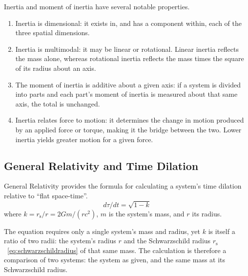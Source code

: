 \documentclass[twoside,twocolumn,9pt,fleqn]{article}
\begin{document}
Inertia and moment of inertia have several notable properties.
\begin{enumerate}
\item Inertia is dimensional: it exists in, and has a component within, each of the three spatial dimensions.
\item Inertia is multimodal: it may be linear or rotational. Linear inertia reflects the mass alone, whereas rotational inertia reflects the mass times the square of its radius about an axis.
\item The moment of inertia is additive about a given axis: if a system is divided into parts and each part's moment of inertia is measured about that same axis, the total is unchanged.
\item Inertia relates force to motion: it determines the change in motion produced by an applied force or torque, making it the bridge between the two. Lower inertia yields greater motion for a given force.
\end{enumerate}
\subsection{General Relativity and Time Dilation}
General Relativity provides the formula for calculating a system's time dilation relative to ``flat space-time''.
\begin{equation}
d\tau/dt = \sqrt{1-k}
\end{equation}
where $k = r_{\mathrm{s}}/r = 2Gm/(rc^2)$, $m$ is the system's mass, and $r$ its radius.

The equation requires only a single system's mass and radius, yet $k$ is itself a ratio of two radii: the system's radius $r$ and the Schwarzschild radius $r_{\mathrm{s}}$~\eqref{eq:schwarzschildradius} of that same mass. The calculation is therefore a comparison of two systems: the system as given, and the same mass at its Schwarzschild radius.
\end{document}
